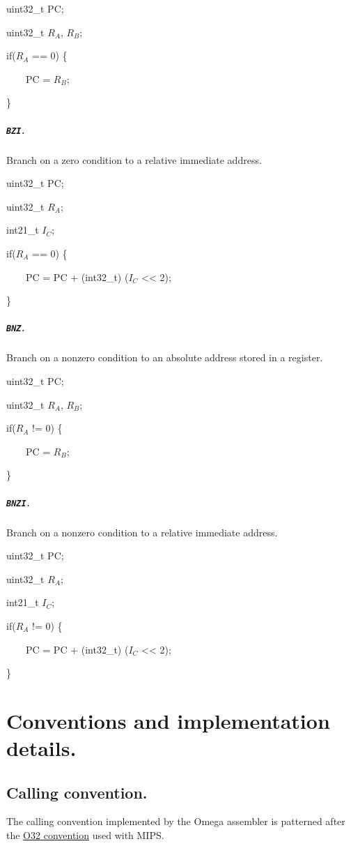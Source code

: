 \documentclass[12pt,english,twoside]{report}
\def\code{\texttt}
\def\subsubsubsection{\paragraph}
\newenvironment{codeblock}
{\begin{list}{}{
\setlength{\rightmargin}{\leftmargin}
\setlength{\listparindent}{0pt}%
\raggedright
\setlength{\itemsep}{0pt}
\setlength{\parsep}{0pt}
\normalfont\ttfamily}%
 \item[]}
{\end{list}}
\begin{document}
\begin{codeblock}
  uint32\_t PC;

  uint32\_t $R_A$, $R_B$;

  if($R_A$ == 0) \{

{}~~~~PC = $R_B$;

  \}
\end{codeblock}

\subsubsubsection{\label{sec:Ins_BZI}\code{BZI}.}
Branch on a zero condition to a relative immediate address.

\begin{codeblock}
  uint32\_t PC;

  uint32\_t $R_A$;

  int21\_t $I_C$;

  if($R_A$ == 0) \{

{}~~~~PC = PC + (int32\_t) ($I_C$ <{}< 2);

  \}
\end{codeblock}

\subsubsubsection{\label{sec:Ins_BNZ}\code{BNZ}.}
Branch on a nonzero condition to an absolute address stored in a register.

\begin{codeblock}
  uint32\_t PC;

  uint32\_t $R_A$, $R_B$;

  if($R_A$ != 0) \{

{}~~~~PC = $R_B$;

  \}
\end{codeblock}

\subsubsubsection{\label{sec:Ins_BNZI}\code{BNZI}.}
Branch on a nonzero condition to a relative immediate address.

\begin{codeblock}
  uint32\_t PC;

  uint32\_t $R_A$;

  int21\_t $I_C$;

  if($R_A$ != 0) \{

{}~~~~PC = PC + (int32\_t) ($I_C$ <{}< 2);

  \}
\end{codeblock}

\chapter{\label{sec:Conventions} Conventions and implementation details.}

\section{\label{sec:CallingConvention} Calling convention.}
 The calling convention implemented by the
Omega assembler is patterned after the
\href{https://en.wikipedia.org/wiki/Calling_convention#MIPS}{O32
  convention} used with MIPS.
\end{document}
